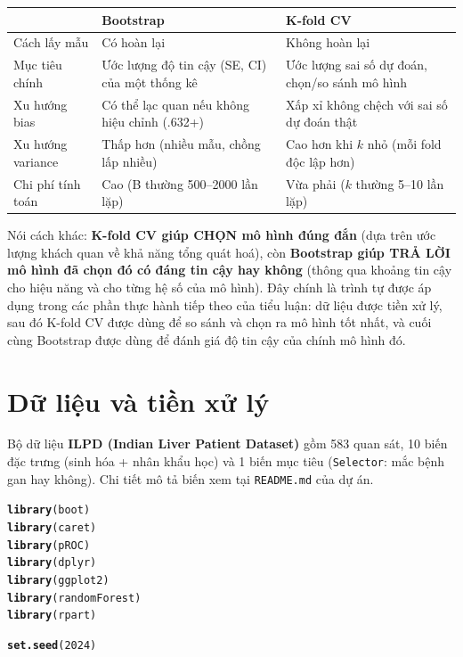\documentclass[14pt,a4paper]{extarticle}\usepackage[]{graphicx}\usepackage[]{xcolor}
\makeatletter
\newcommand{\hlnum}[1]{\textcolor[rgb]{0.686,0.059,0.569}{#1}}%
\newcommand{\hldef}[1]{\textcolor[rgb]{0.345,0.345,0.345}{#1}}%
\newcommand{\hlkwd}[1]{\textcolor[rgb]{0.737,0.353,0.396}{\textbf{#1}}}%
\newenvironment{kframe}{%
 \def\at@end@of@kframe{}%
 \ifinner\ifhmode%
  \def\at@end@of@kframe{\end{minipage}}%
  \begin{minipage}{\columnwidth}%
 \fi\fi%
 \def\FrameCommand##1{\hskip\@totalleftmargin \hskip-\fboxsep
 \colorbox{shadecolor}{##1}\hskip-\fboxsep
     \hskip-\linewidth \hskip-\@totalleftmargin \hskip\columnwidth}%
 \MakeFramed {\advance\hsize-\width
   \@totalleftmargin\z@ \linewidth\hsize
   \@setminipage}}%
 {\par\unskip\endMakeFramed%
 \at@end@of@kframe}
\newenvironment{knitrout}{}{} %
\makeatother
\begin{document}
\begin{center}
\small
\begin{tabular}{@{}p{2.6cm}p{5.9cm}p{5.9cm}@{}}
\toprule
 & \textbf{Bootstrap} & \textbf{K-fold CV} \\
\midrule
Cách lấy mẫu & Có hoàn lại & Không hoàn lại \\
Mục tiêu chính & Ước lượng độ tin cậy (SE, CI) của một thống kê & Ước lượng sai số dự đoán, chọn/so sánh mô hình \\
Xu hướng bias & Có thể lạc quan nếu không hiệu chỉnh (.632+) & Xấp xỉ không chệch với sai số dự đoán thật \\
Xu hướng variance & Thấp hơn (nhiều mẫu, chồng lấp nhiều) & Cao hơn khi $k$ nhỏ (mỗi fold độc lập hơn) \\
Chi phí tính toán & Cao (B thường 500--2000 lần lặp) & Vừa phải ($k$ thường 5--10 lần lặp) \\
\bottomrule
\end{tabular}
\end{center}

Nói cách khác: \textbf{K-fold CV giúp CHỌN mô hình đúng đắn} (dựa trên ước
lượng khách quan về khả năng tổng quát hoá), còn \textbf{Bootstrap giúp
TRẢ LỜI mô hình đã chọn đó có đáng tin cậy hay không} (thông qua khoảng
tin cậy cho hiệu năng và cho từng hệ số của mô hình). Đây chính là trình
tự được áp dụng trong các phần thực hành tiếp theo của tiểu luận: dữ liệu
được tiền xử lý, sau đó K-fold CV được dùng để so sánh và chọn ra mô hình
tốt nhất, và cuối cùng Bootstrap được dùng để đánh giá độ tin cậy của
chính mô hình đó.

\section{Dữ liệu và tiền xử lý}

Bộ dữ liệu \textbf{ILPD (Indian Liver Patient Dataset)} gồm 583 quan sát,
10 biến đặc trưng (sinh hóa + nhân khẩu học) và 1 biến mục tiêu
(\texttt{Selector}: mắc bệnh gan hay không). Chi tiết mô tả biến xem tại
\texttt{README.md} của dự án.

\begin{knitrout}\scriptsize
{}\color{fgcolor}\begin{kframe}
\begin{alltt}
\hlkwd{library}\hldef{(boot)}
\hlkwd{library}\hldef{(caret)}
\hlkwd{library}\hldef{(pROC)}
\hlkwd{library}\hldef{(dplyr)}
\hlkwd{library}\hldef{(ggplot2)}
\hlkwd{library}\hldef{(randomForest)}
\hlkwd{library}\hldef{(rpart)}

\hlkwd{set.seed}\hldef{(}\hlnum{2024}\hldef{)}
\end{alltt}
\end{kframe}
\end{knitrout}
\end{document}
